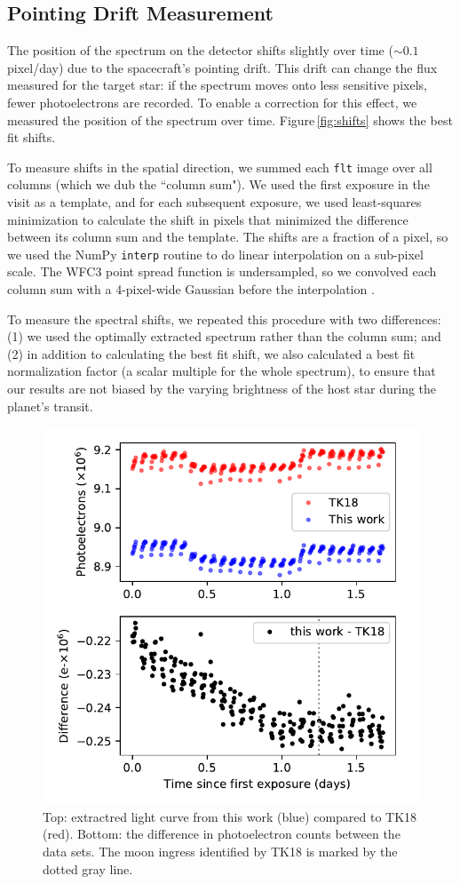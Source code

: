 \documentclass[twocolumn,trackchanges]{aastex62}
\begin{document}
\subsection{Pointing Drift Measurement}
The position of the spectrum on the detector shifts slightly over time ($\sim0.1$ pixel/day) due to the spacecraft's pointing drift. This drift can change the flux measured for the target star: if the spectrum moves onto less sensitive pixels, fewer photoelectrons are recorded. To enable a correction for this effect, we measured the position of the spectrum over time.  Figure\,\ref{fig:shifts} shows the best fit shifts. 

To measure shifts in the spatial direction, we summed each \texttt{flt} image over all columns (which we dub the ``column sum"). We used the first exposure in the visit as a template, and for each subsequent exposure, we used least-squares minimization to calculate the shift in pixels that minimized the difference between its column sum and the template. The shifts are a fraction of a pixel, so we used the NumPy \texttt{interp} routine to do linear interpolation on a sub-pixel scale. The WFC3 point spread function is undersampled, so we convolved each column sum with a 4-pixel-wide Gaussian  before the interpolation \citep[following][]{deming13}.  

To measure the spectral shifts, we repeated this procedure with two differences: (1) we used the optimally extracted spectrum rather than the column sum; and (2) in addition to calculating the best fit shift, we also calculated a best fit normalization factor (a scalar multiple for the whole spectrum), to ensure that our results are not biased by the varying brightness of the host star during the planet's transit. 


\begin{figure}
\includegraphics[width = 0.5 \textwidth]{fig2_rawdata.pdf}
    \caption{Top: extractred light curve from this work (blue) compared to TK18 (red). Bottom: the difference in photoelectron counts between the data sets. The moon ingress identified by TK18 is marked by the dotted gray line.}
\label{fig:raw}
\end{figure}
\end{document}
